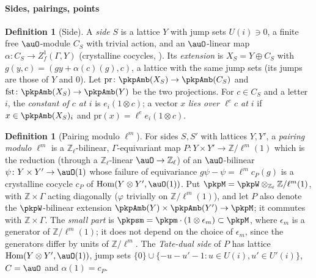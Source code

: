 \documentclass[10pt]{amsart}
\theoremstyle{definition}
\newtheorem{definition}[theorem]{Definition}
\theoremstyle{remark}
\newcommand{\Z}{\mathbb Z}
\begin{document}
\paragraph*{Sides, pairings, points}

\begin{definition}[Side]\label{pkp:def-side}
A \emph{side} $S$ is a lattice $Y$ with jump sets $U(i)\ni0$, a finite free $\auO$-module $C_S$ with
trivial action, and an $\auO$-linear map $\alpha\colon C_S\to Z^1_f(\Gamma,Y)$ (crystalline
cocycles, {\cite[Definition~5.1]{P55}}). Its \emph{extension} is $X_S=Y\oplus C_S$ with
$g(y,c)=(gy+\alpha(c)(g),c)$, a lattice with the same jump sets (its jumps are those of $Y$ and $0$).
Let $\mathrm{pr}\colon\pkpAmb(X_S)\to\pkpAmb(C_S)$ and $\mathrm{fst}\colon\pkpAmb(X_S)\to\pkpAmb(Y)$
be the two projections. For $c\in C_S$ and a letter $i$, the \emph{constant of $c$ at $i$} is
$e_i(1\otimes c)$; a vector $x$ \emph{lies over $\ell^ec$ at $i$} if $x\in\pkpAmb(X_S)_i$ and
$\mathrm{pr}(x)=\ell^ee_i(1\otimes c)$.
\end{definition}

\begin{definition}[Pairing modulo $\ell^m$]\label{pkp:def-pairing}
For sides $S,S'$ with lattices $Y,Y'$, a \emph{pairing modulo $\ell^m$} is a $\Z_\ell$-bilinear,
$\Gamma$-equivariant map $P\colon Y\times Y'\to\Z/\ell^m(1)$ which is the reduction (through a
$\Z_\ell$-linear $\auO\to\Z_\ell$) of an $\auO$-bilinear $\psi\colon Y\times Y'\to\auO(1)$ whose
failure of equivariance $g\psi-\psi=\ell^m c_P(g)$ is a crystalline cocycle $c_P$ of
$\operatorname{Hom}(Y\otimes Y',\auO(1))$. Put $\pkpM=\pkpW\otimes_{\Z_\ell}\Z/\ell^m(1)$, with
$\Z\times\Gamma$ acting diagonally ($\varphi$ trivially on $\Z/\ell^m(1)$), and let $P$ also denote
the $\pkpW$-bilinear extension $\pkpAmb(Y)\times\pkpAmb(Y')\to\pkpM$; it commutes with $\Z\times\Gamma$.
The \emph{small part} is $\pkpsm=\pkpm\cdot(1\otimes\epsilon_m)\subset\pkpM$, where $\epsilon_m$ is a generator of $\Z/\ell^m(1)$; it does not depend on the choice of $\epsilon_m$, since the generators differ by units of $\Z/\ell^m$. The \emph{Tate-dual side} of
$P$ has lattice $\operatorname{Hom}(Y\otimes Y',\auO(1))$, jump sets $\{0\}\cup\{-u-u'-1:u\in U(i),
u'\in U'(i)\}$, $C=\auO$ and $\alpha(1)=c_P$.
\end{definition}
\end{document}
